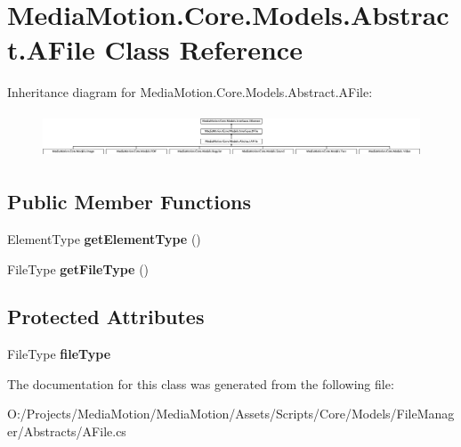 \hypertarget{class_media_motion_1_1_core_1_1_models_1_1_abstract_1_1_a_file}{\section{Media\+Motion.\+Core.\+Models.\+Abstract.\+A\+File Class Reference}
\label{class_media_motion_1_1_core_1_1_models_1_1_abstract_1_1_a_file}
}
Inheritance diagram for Media\+Motion.\+Core.\+Models.\+Abstract.\+A\+File\+:\begin{figure}[H]
\begin{center}
\leavevmode
\includegraphics[height=1.328588cm]{class_media_motion_1_1_core_1_1_models_1_1_abstract_1_1_a_file}
\end{center}
\end{figure}
\subsection*{Public Member Functions}
\begin{DoxyCompactItemize}
\item 
\hypertarget{class_media_motion_1_1_core_1_1_models_1_1_abstract_1_1_a_file_a5301a4dd52ccbaf6a2185c407871f51e}{Element\+Type {\bfseries get\+Element\+Type} ()}\label{class_media_motion_1_1_core_1_1_models_1_1_abstract_1_1_a_file_a5301a4dd52ccbaf6a2185c407871f51e}

\item 
\hypertarget{class_media_motion_1_1_core_1_1_models_1_1_abstract_1_1_a_file_a9c2c24170fe743b1ab0042f02687b090}{File\+Type {\bfseries get\+File\+Type} ()}\label{class_media_motion_1_1_core_1_1_models_1_1_abstract_1_1_a_file_a9c2c24170fe743b1ab0042f02687b090}

\end{DoxyCompactItemize}
\subsection*{Protected Attributes}
\begin{DoxyCompactItemize}
\item 
\hypertarget{class_media_motion_1_1_core_1_1_models_1_1_abstract_1_1_a_file_a44655451e9d959d2348ca0f6317da796}{File\+Type {\bfseries file\+Type}}\label{class_media_motion_1_1_core_1_1_models_1_1_abstract_1_1_a_file_a44655451e9d959d2348ca0f6317da796}

\end{DoxyCompactItemize}


The documentation for this class was generated from the following file\+:\begin{DoxyCompactItemize}
\item 
O\+:/\+Projects/\+Media\+Motion/\+Media\+Motion/\+Assets/\+Scripts/\+Core/\+Models/\+File\+Manager/\+Abstracts/A\+File.\+cs\end{DoxyCompactItemize}
